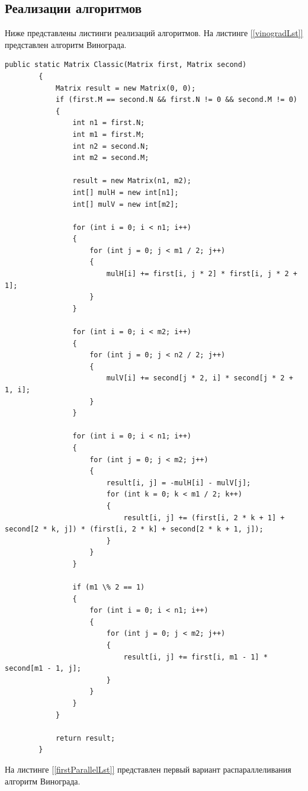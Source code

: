 \documentclass{article}
\begin{document}
	\subsection{Реализации алгоритмов}
	Ниже представлены листинги реализаций алгоритмов.
	На листинге \hyperref[vinogradLst]{[\ref{vinogradLst}]} представлен алгоритм Винограда.
	\begin{lstlisting}[label=vinogradLst, caption=Алгоритм Винограда]
	public static Matrix Classic(Matrix first, Matrix second)
        {
            Matrix result = new Matrix(0, 0);
            if (first.M == second.N && first.N != 0 && second.M != 0)
            {
                int n1 = first.N;
                int m1 = first.M;
                int n2 = second.N;
                int m2 = second.M;

                result = new Matrix(n1, m2);
                int[] mulH = new int[n1];
                int[] mulV = new int[m2];

                for (int i = 0; i < n1; i++)
                {
                    for (int j = 0; j < m1 / 2; j++)
                    {
                        mulH[i] += first[i, j * 2] * first[i, j * 2 + 1];
                    }
                }

                for (int i = 0; i < m2; i++)
                {
                    for (int j = 0; j < n2 / 2; j++)
                    {
                        mulV[i] += second[j * 2, i] * second[j * 2 + 1, i];
                    }
                }

                for (int i = 0; i < n1; i++)
                {
                    for (int j = 0; j < m2; j++)
                    {
                        result[i, j] = -mulH[i] - mulV[j];
                        for (int k = 0; k < m1 / 2; k++)
                        {
                            result[i, j] += (first[i, 2 * k + 1] + second[2 * k, j]) * (first[i, 2 * k] + second[2 * k + 1, j]);
                        }
                    }
                }

                if (m1 \% 2 == 1)
                {
                    for (int i = 0; i < n1; i++)
                    {
                        for (int j = 0; j < m2; j++)
                        {
                            result[i, j] += first[i, m1 - 1] * second[m1 - 1, j];
                        }
                    }
                }
            }

            return result;
        }
	\end{lstlisting}
		На листинге \hyperref[firstParallelLst]{[\ref{firstParallelLst}]} представлен первый вариант распараллеливания алгоритм Винограда.
\end{document}
